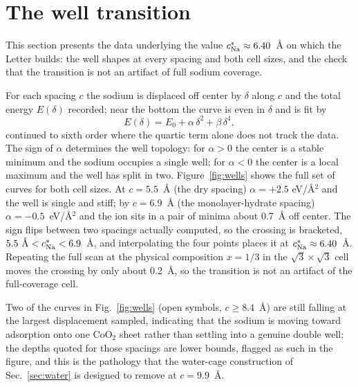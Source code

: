 \documentclass[aps,10pt,preprint,superscriptaddress,floatfix]{revtex4-2}
\begin{document}
\FloatBarrier
\section{The well transition}
\label{sec:wells}

This section presents the data underlying the value $c^\ast_{\rm Na}\approx6.40$~\AA{} on which the
Letter builds: the well shapes at every spacing and both cell sizes, and the check that the
transition is not an artifact of full sodium coverage.

For each spacing $c$ the sodium is displaced off center by $\delta$ along $c$ and the total energy
$E(\delta)$ recorded; near the bottom the curve is even in $\delta$ and is fit by
\begin{equation}
  E(\delta) = E_0 + \alpha\,\delta^{2} + \beta\,\delta^{4},
  \label{eq:landau}
\end{equation}
continued to sixth order where the quartic term alone does not track the data. The sign of $\alpha$
determines the well topology: for $\alpha>0$ the center is a stable minimum and the sodium occupies
a single well; for $\alpha<0$ the center is a local maximum and the well has split in two. Figure~\ref{fig:wells}
shows the full set of curves for both cell sizes. At $c=5.5$~\AA{} (the dry spacing) $\alpha=+2.5$
eV/\AA$^2$ and the well is single and stiff; by $c=6.9$~\AA{} (the monolayer-hydrate spacing)
$\alpha=-0.5$~eV/\AA$^2$ and the ion sits in a pair of minima about 0.7~\AA{} off center. The sign
flips between two spacings actually computed, so the crossing is bracketed,
$5.5~\text{\AA}<c^\ast_{\rm Na}<6.9$~\AA, and interpolating the four points places it at
$c^\ast_{\rm Na}\approx6.40$~\AA. Repeating the full scan at the physical composition $x=1/3$ in the
$\sqrt3\times\sqrt3$ cell moves the crossing by only about 0.2~\AA, so the transition is not an
artifact of the full-coverage cell.

Two of the curves in Fig.~\ref{fig:wells} (open symbols, $c\geq8.4$~\AA) are still falling at the
largest displacement sampled, indicating that the sodium is moving toward adsorption onto one
CoO$_2$ sheet rather than settling into a genuine double well; the depths quoted for those spacings
are lower bounds, flagged as such in the figure, and this is the pathology that the water-cage
construction of Sec.~\ref{sec:water} is designed to remove at $c=9.9$~\AA.
\end{document}
